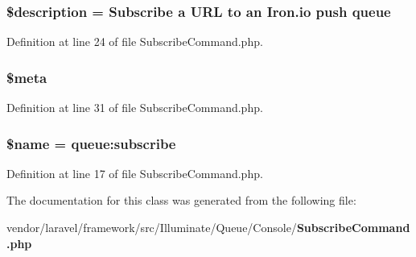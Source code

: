 \subsubsection[{\$description}]{\setlength{\rightskip}{0pt plus 5cm}\$description = \textquotesingle{}Subscribe {\bf a} {\bf U\+R\+L} {\bf to} an {\bf Iron.\+io} push {\bf queue}\textquotesingle{}\hspace{0.3cm}{\ttfamily [protected]}}\label{class_illuminate_1_1_queue_1_1_console_1_1_subscribe_command_a87b032cba06009e3467abf1c8018d960}


Definition at line 24 of file Subscribe\+Command.\+php.

\subsubsection[{\$meta}]{\setlength{\rightskip}{0pt plus 5cm}\$meta\hspace{0.3cm}{\ttfamily [protected]}}\label{class_illuminate_1_1_queue_1_1_console_1_1_subscribe_command_a9e6fc1ae0498be7d1e682f8bcc9299df}


Definition at line 31 of file Subscribe\+Command.\+php.

\subsubsection[{\$name}]{\setlength{\rightskip}{0pt plus 5cm}\${\bf name} = \textquotesingle{}queue\+:subscribe\textquotesingle{}\hspace{0.3cm}{\ttfamily [protected]}}\label{class_illuminate_1_1_queue_1_1_console_1_1_subscribe_command_ab2fc40d43824ea3e1ce5d86dee0d763b}


Definition at line 17 of file Subscribe\+Command.\+php.



The documentation for this class was generated from the following file\+:\begin{DoxyCompactItemize}
\item 
vendor/laravel/framework/src/\+Illuminate/\+Queue/\+Console/{\bf Subscribe\+Command.\+php}\end{DoxyCompactItemize}
